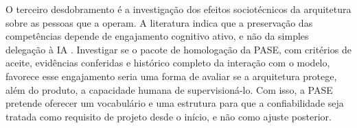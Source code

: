 O terceiro desdobramento é a investigação dos efeitos sociotécnicos da arquitetura sobre as pessoas que a operam. A literatura indica que a preservação das competências depende de engajamento cognitivo ativo, e não da simples delegação à IA \cite{shen2026skill}. Investigar se o pacote de homologação da PASE, com critérios de aceite, evidências conferidas e histórico completo da interação com o modelo, favorece esse engajamento seria uma forma de avaliar se a arquitetura protege, além do produto, a capacidade humana de supervisioná-lo. Com isso, a PASE pretende oferecer um vocabulário e uma estrutura para que a confiabilidade seja tratada como requisito de projeto desde o início, e não como ajuste posterior.
